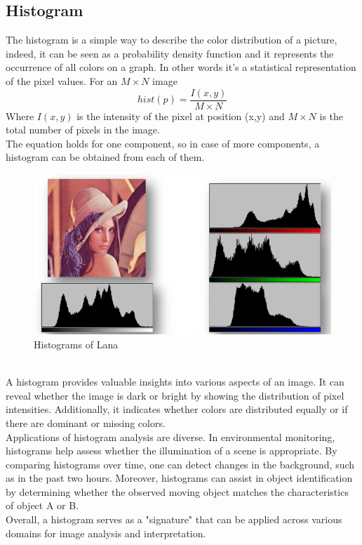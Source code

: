 \subsection{Histogram}
The histogram is a simple way to describe the color distribution of a picture, indeed, it can be seen as a probability density function and it represents the occurrence of all colors on a graph.
In other words it’s a statistical representation of the pixel values. For an $M \times N$ image
\[
    hist(p) = \frac{I(x,y)}{M \times N}
\]
Where $I(x,y)$ is the intensity of the pixel at position (x,y) and $M \times N$ is the total number of pixels in the image.\\
The equation holds for one component, so in case of more components, a histogram can be obtained from each of them.
\begin{figure}[h]
    \centering
    \includegraphics[scale=0.5]{Figures/Histogram.png}
    \caption{Histograms of Lana}
    \label{fig:enter-label}
\end{figure}
\\
A histogram provides valuable insights into various aspects of an image. It can reveal whether the image is dark or bright by showing the distribution of pixel intensities. 
Additionally, it indicates whether colors are distributed equally or if there are dominant or missing colors.
\\
Applications of histogram analysis are diverse. 
In environmental monitoring, histograms help assess whether the illumination of a scene is appropriate. 
By comparing histograms over time, one can detect changes in the background, such as in the past two hours. 
Moreover, histograms can assist in object identification by determining whether the observed moving object matches the characteristics of object A or B. 
\\Overall, a histogram serves as a "signature" that can be applied across various domains for image analysis and interpretation.
